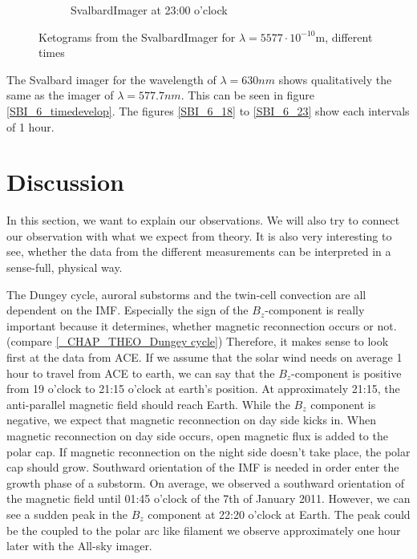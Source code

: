 \documentclass[10pt,a4paper]{article}
\begin{document}
\begin{figure}[h]
\begin{subfigure}{0.3\textwidth}
	\caption{ SvalbardImager at 23:00 o'clock \label{SBI_5_23}}
\end{subfigure}
\caption{Ketograms from the SvalbardImager for $\lambda=5577 \cdot 10^{-10} \mathrm{m}$, different times }
\label{SBI_5_timedevelop}
\end{figure}

The Svalbard imager for the wavelength of $\lambda=630 nm$ shows qualitatively the same as the imager of $\lambda=577.7 nm$.  This can be seen in figure \ref{SBI_6_timedevelop}. The figures \ref{SBI_6_18} to \ref{SBI_6_23} show each intervals of 1 hour. 

\clearpage


\section{Discussion \label{discussion}}

In this section, we want to explain our observations. We will also try to connect our observation with what we expect from theory. 
It is also very interesting to see, whether the data from the different measurements can be interpreted in a sense-full, physical way.

The Dungey cycle, auroral substorms and the twin-cell convection are all dependent on the IMF. Especially the sign of the $B_z$-component is really important because it 
determines, whether magnetic reconnection occurs or not. (compare \ref{_CHAP_THEO_Dungey cycle}) Therefore, it makes sense to look first at the data from ACE. 
If we assume that the solar wind needs on average 1 hour to travel from ACE to earth, we can say that the $B_z$-component is positive from 19 o'clock to 21:15 o'clock 
at earth's position. At approximately 21:15, the anti-parallel magnetic field should reach Earth. While the $B_z$ component is negative, we expect that magnetic 
reconnection on day side kicks in. When magnetic reconnection on day side occurs, open magnetic flux is added to the polar cap. If magnetic reconnection on the night side doesn't take place, the polar cap should grow. Southward orientation of the IMF is needed in order enter the growth phase of a substorm. On average, we observed a 
southward orientation of the magnetic field until 01:45 o'clock of the 7th of January 2011. However, we can see a sudden peak in the $B_z$ component at 22:20 o'clock at 
Earth. The peak could be the coupled to the polar arc like filament we observe approximately one hour later with the All-sky imager. 
\end{document}
